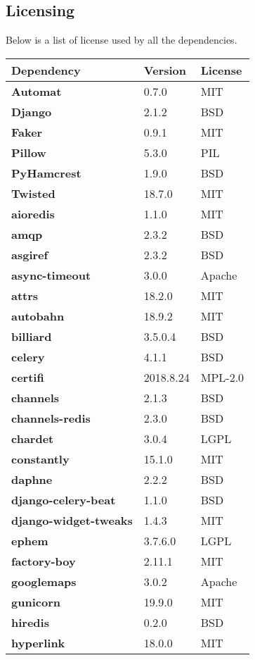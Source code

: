 \subsection{Licensing}
Below is a list of license used by all the dependencies.
\begin{longtable}{| p{} | p{} | p{} |}
\hline
\textbf{Dependency} & \textbf{Version} & \textbf{License} \\ \hline
\textbf{Automat} & 0.7.0 & MIT \\
\textbf{Django} & 2.1.2 & BSD \\
\textbf{Faker} & 0.9.1 & MIT \\
\textbf{Pillow} & 5.3.0 & PIL \\
\textbf{PyHamcrest} & 1.9.0 & BSD \\
\textbf{Twisted} & 18.7.0 & MIT \\
\textbf{aioredis} & 1.1.0 & MIT \\
\textbf{amqp} & 2.3.2 & BSD \\
\textbf{asgiref} & 2.3.2 & BSD \\
\textbf{async-timeout} & 3.0.0 & Apache \\
\textbf{attrs} & 18.2.0 & MIT \\
\textbf{autobahn} & 18.9.2 & MIT \\
\textbf{billiard} & 3.5.0.4 & BSD \\
\textbf{celery} & 4.1.1 & BSD \\
\textbf{certifi} & 2018.8.24 & MPL-2.0 \\
\textbf{channels} & 2.1.3 & BSD \\
\textbf{channels-redis} & 2.3.0 & BSD \\
\textbf{chardet} & 3.0.4 & LGPL \\
\textbf{constantly} & 15.1.0 & MIT \\
\textbf{daphne} & 2.2.2 & BSD \\
\textbf{django-celery-beat} & 1.1.0 & BSD \\
\textbf{django-widget-tweaks} & 1.4.3 & MIT \\
\textbf{ephem} & 3.7.6.0 & LGPL \\
\textbf{factory-boy} & 2.11.1 & MIT \\
\textbf{googlemaps} & 3.0.2 & Apache \\
\textbf{gunicorn} & 19.9.0 & MIT \\
\textbf{hiredis} & 0.2.0 & BSD \\
\textbf{hyperlink} & 18.0.0 & MIT \\

\end{longtable}

